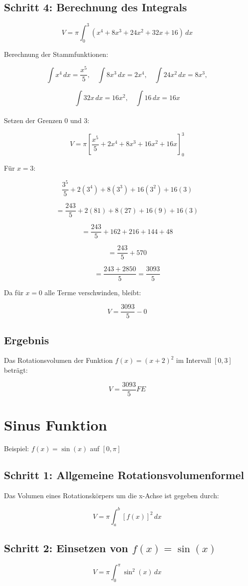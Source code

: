 \documentclass[a4paper,final]{report}
\begin{document}
\subsection{Schritt 4: Berechnung des Integrals}
\[
V = \pi \int_0^3 (x^4 + 8x^3 + 24x^2 + 32x + 16) \, dx
\]

Berechnung der Stammfunktionen:

\[
\int x^4 \, dx = \frac{x^5}{5}, \quad \int 8x^3 \, dx = 2x^4, \quad \int 24x^2 \, dx = 8x^3,
\]

\[
\int 32x \, dx = 16x^2, \quad \int 16 \, dx = 16x
\]
\\
Setzen der Grenzen \( 0 \) und \( 3 \):

\[
V = \pi \left[ \frac{x^5}{5} + 2x^4 + 8x^3 + 16x^2 + 16x \right]_0^3
\]

Für \( x = 3 \):

\[
\frac{3^5}{5} + 2(3^4) + 8(3^3) + 16(3^2) + 16(3)
\]

\[
= \frac{243}{5} + 2(81) + 8(27) + 16(9) + 16(3)
\]

\[
= \frac{243}{5} + 162 + 216 + 144 + 48
\]

\[
= \frac{243}{5} + 570
\]

\[
= \frac{243 + 2850}{5} = \frac{3093}{5}
\]

Da für \( x = 0 \) alle Terme verschwinden, bleibt:

\[
V =\frac{3093}{5} - 0
\] 
\subsection{Ergebnis}
Das Rotationsvolumen der Funktion \( f(x) = (x+2)^2 \) im Intervall \( [0, 3] \) beträgt: 

\[V = \frac{3093}{5} FE\]

\section{Sinus Funktion}
Beispiel: \( f(x) = \sin(x) \) auf \( [0, \pi] \)

\subsection{Schritt 1: Allgemeine Rotationsvolumenformel}
Das Volumen eines Rotationskörpers um die x-Achse ist gegeben durch:

\[
V = \pi \int_a^b [f(x)]^2 \, dx
\]

\subsection{Schritt 2: Einsetzen von \( f(x) = \sin(x) \)}
\[
V = \pi \int_0^\pi \sin^2(x) \, dx
\]
\end{document}
